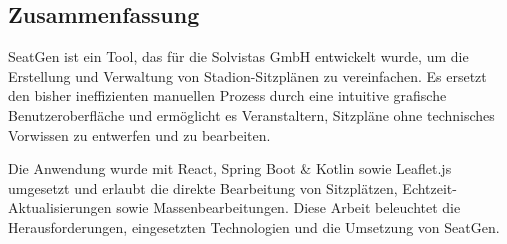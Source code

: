 \begin{spacing}{1}
  \chapter*{Zusammenfassung}
\end{spacing}
SeatGen ist ein Tool, das für die Solvistas GmbH entwickelt wurde, um die Erstellung und Verwaltung von Stadion-Sitzplänen zu vereinfachen. Es ersetzt den bisher ineffizienten manuellen Prozess durch eine intuitive grafische Benutzeroberfläche und ermöglicht es Veranstaltern, Sitzpläne ohne technisches Vorwissen zu entwerfen und zu bearbeiten.

Die Anwendung wurde mit React, Spring Boot \& Kotlin sowie Leaflet.js umgesetzt und erlaubt die direkte Bearbeitung von Sitzplätzen, Echtzeit-Aktualisierungen sowie Massenbearbeitungen. Diese Arbeit beleuchtet die Herausforderungen, eingesetzten Technologien und die Umsetzung von SeatGen.
\newpage
